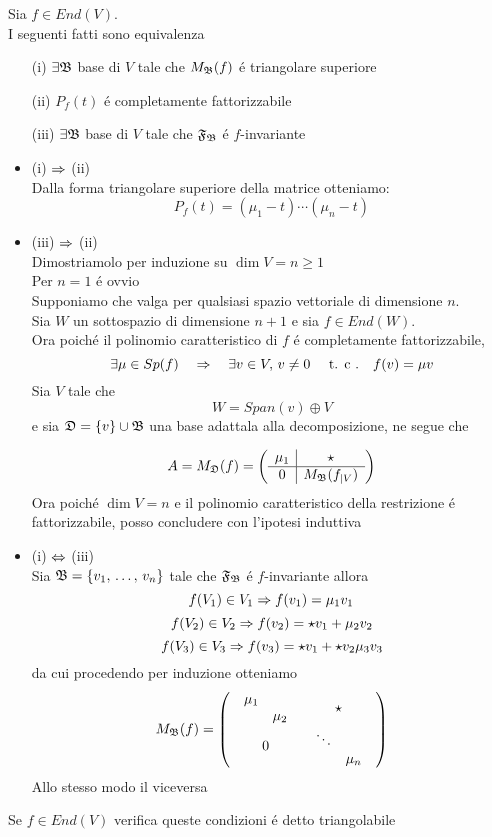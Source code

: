 \begin{prop} Sia $f \in End(V) $.\\
I seguenti fatti sono equivalenza
\begin{itemize}
\item[(i)]$\exists \mathfrak{B}$ base di $V$ tale che $M_{\mathfrak{B}}(f)$ \'e triangolare superiore 
\item[(ii)]$P_f(t)$ \'e completamente fattorizzabile
\item[(iii)]$\exists \mathfrak{B} $ base di $V$ tale che $ \mathfrak{F}_{\mathfrak{B}}$ \'e $f$-invariante
\end{itemize}
\proof \bianco
\begin{itemize}
\item (i) $\Rightarrow $ (ii)\\
Dalla forma triangolare superiore della matrice otteniamo:
$$P_f(t)=( \mu_1 -t ) \cdots (\mu_n -t ) $$
\item (iii) $\Rightarrow $ (ii) \\
Dimostriamolo per induzione su $\dim V=n \geq 1 $\\
Per $n=1$ \'e ovvio\\
Supponiamo che valga per qualsiasi spazio vettoriale di dimensione $n$.\\
Sia $W$ un sottospazio di dimensione $n+1$ e sia $f\in End(W)$.\\
Ora poich\'e il polinomio caratteristico di $f$ \'e completamente fattorizzabile,$$\exists \mu \in Sp(f)\quad \Rightarrow \quad \exists v \in V , \, v\neq 0 \quad \text{ t. c .} \quad f(v)=\mu v $$
Sia $V$ tale che 
$$ W = Span(v) \oplus V $$ e sia $\mathfrak{D}=\{ v \} \cup \mathfrak{B}$ una base adattala alla decomposizione, ne segue che 

$$ A=M_{\mathfrak{D}}(f) =   
\left(
\begin{array}{c|c}
\mu_1 & \star \\
\hline
0 & M_{\mathfrak{B}}(f_{\vert V})
\end{array}
\right)
$$
Ora poich\'e $\dim V = n $ e il polinomio caratteristico della restrizione \'e fattorizzabile, posso concludere con l'ipotesi induttiva
\item (i) $\Leftrightarrow $ (iii) \\
Sia $\mathfrak{B} =\{ v_1, \, \dots , \, v_n \} $ tale che $ \mathfrak{F}_{\mathfrak{B}}$ \'e $f$-invariante allora
$$f(V_1)\in V_1 \Rightarrow f(v_1)=\mu_1 v_1 $$
$$f(V_2)\in V_2 \Rightarrow f(v_2)=\star v_1 + \mu_2 v_2$$
$$f(V_3)\in V_3 \Rightarrow f(v_3)=\star v_1 + \star v_2 \mu_3 v_3 $$
da cui procedendo per induzione otteniamo 
$$ M_{\mathfrak{B}}(f) = \left( \begin{array}{cc} \begin{array}{cc} \mu_1 &  \\ & \mu_2 \end{array} & \star \\  0 &  \begin{array}{cc} \ddots &  \\ & \mu_n \end{array} \end{array}\right)
$$
Allo stesso modo il viceversa


\end{itemize}
\end{prop}
\begin{defn} Se $f\in End(V) $ verifica queste condizioni \'e detto triangolabile
\end{defn}

